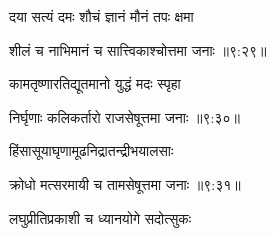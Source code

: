 {\devanagarifont दया सत्यं दमः शौचं ज्ञानं मौनं तपः क्षमा \thinspace{\dandab} \dontdisplaylinenum }%


{\devanagarifont शीलं च नाभिमानं च सात्त्विकाश्चोत्तमा जनाः {॥९:२९॥} \veg\dontdisplaylinenum }%

{\devanagarifont कामतृष्णारतिद्यूतमानो युद्धं मदः स्पृहा \thinspace{\dandab} \dontdisplaylinenum }%


{\devanagarifont निर्घृणाः कलिकर्तारो राजसेषूत्तमा जनाः {॥९:३०॥} \veg\dontdisplaylinenum }%

{\devanagarifont हिंसासूयाघृणामूढनिद्रातन्द्रीभयालसाः \thinspace{\dandab} \dontdisplaylinenum }%


{\devanagarifont क्रोधो मत्सरमायी च तामसेषूत्तमा जनाः {॥९:३१॥} \veg\dontdisplaylinenum }%

\vfill
\pageparbreak
\vers

{\devanagarifont लघुप्रीतिप्रकाशी च ध्यानयोगे सदोत्सुकः \thinspace{\dandab} \dontdisplaylinenum }%

